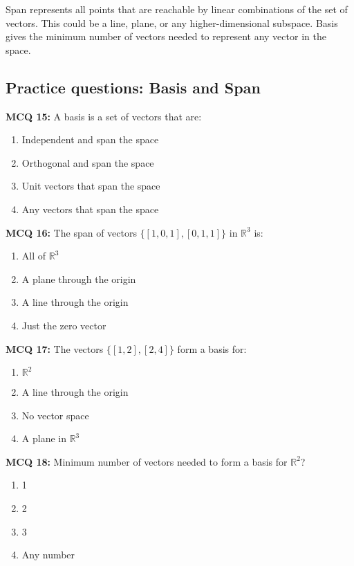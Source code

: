\documentclass[11pt,a4paper]{article}
\theoremstyle{definition}
\begin{document}
Span represents all points that are reachable by linear combinations of the set of vectors. 
This could be a line, plane, or any higher-dimensional subspace. Basis gives the minimum number of vectors needed to represent any vector in the space.

\subsection{Practice questions: Basis and Span}

\textbf{MCQ 15:} A basis is a set of vectors that are:

\begin{enumerate}
    \item Independent and span the space
    \item Orthogonal and span the space
    \item Unit vectors that span the space
    \item Any vectors that span the space
\end{enumerate}

\noindent \textbf{MCQ 16:} The span of vectors $\{[1, 0, 1], [0, 1, 1]\}$ in $\mathbb{R}^3$ is:

\begin{enumerate}
    \item All of $\mathbb{R}^3$
    \item A plane through the origin
    \item A line through the origin
    \item Just the zero vector
\end{enumerate}

\noindent \textbf{MCQ 17:} The vectors $\{[1, 2], [2, 4]\}$ form a basis for:

\begin{enumerate}
    \item $\mathbb{R}^2$
    \item A line through the origin
    \item No vector space
    \item A plane in $\mathbb{R}^3$
\end{enumerate}

\noindent \textbf{MCQ 18:} Minimum number of vectors needed to form a basis for $\mathbb{R}^2$?

\begin{enumerate}
    \item 1
    \item 2
    \item 3
    \item Any number
\end{enumerate}
\end{document}
